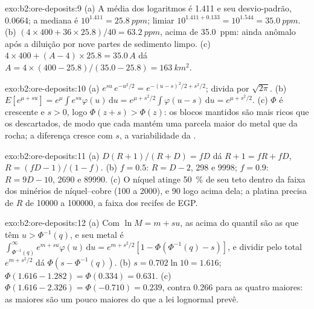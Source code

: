 \begin{solution}{exo:b2:ore-deposits:9}
(a) A média dos logaritmos é 1.411 e seu desvio-padrão, 0.0664; a mediana é $10^{1.411} = \qty{25.8}{ppm}$;
limiar $10^{1.411 + 0.133} = 10^{1.544} = \qty{35.0}{ppm}$. (b) $(4 \times 400 + 36 \times 25.8)/40 =
\qty{63.2}{ppm}$, acima de \qty{35.0}{ppm}: ainda anômalo após a diluição por nove partes de sedimento
limpo. (c) $4 \times 400 + (A - 4) \times 25.8 = 35.0\,A$ dá $A = 4 \times (400 -
25.8)/(35.0 - 25.8) = \qty{163}{km^2}$.
\end{solution}

\begin{solution}{exo:b2:ore-deposits:10}
(a) $e^{su}\,e^{-u^2/2} = e^{-(u - s)^2/2 + s^2/2}$; divida por $\sqrt{2\pi}$. (b) $E[e^{\mu + su}] =
e^{\mu}\int e^{su}\varphi(u)\,\mathrm{d}u = e^{\mu + s^2/2}\int\varphi(u - s)\,\mathrm{d}u = e^{\mu +
s^2/2}$. (c) $\Phi$ é crescente e $s > 0$, logo $\Phi(z + s) > \Phi(z)$: os blocos mantidos são mais ricos que
os descartados, de modo que cada  mantém uma parcela maior do metal que da rocha; a
diferença cresce com $s$, a variabilidade da .
\end{solution}

\begin{solution}{exo:b2:ore-deposits:11}
(a) $D(R + 1)/(R + D) = fD$ dá $R + 1 = fR + fD$, $R = (fD - 1)/(1 - f)$. (b) $f = 0.5$: $R = D - 2$,
298 e \num{9998}; $f = 0.9$: $R = 9D - 10$, \num{2690} e \num{89990}. (c) O níquel atinge
\qty{50}{\percent} de seu teto dentro da faixa dos minérios de níquel--cobre (100 a \num{2000}), e 90 logo acima dela;
a platina precisa de $R$ de \num{10000} a \num{100000}, a faixa dos recifes de EGP.
\end{solution}

\begin{solution}{exo:b2:ore-deposits:12}
(a) Com $\ln M = m + s u$, as  acima do quantil são as que têm $u > \Phi^{-1}(q)$, e seu metal é
$\int_{\Phi^{-1}(q)}^{\infty} e^{m + su}\varphi(u)\,\mathrm{d}u = e^{m + s^2/2}[1 - \Phi(\Phi^{-1}(q) -
s)]$, e dividir pelo total $e^{m + s^2/2}$ dá $\Phi(s - \Phi^{-1}(q))$. (b) $s = 0.702 \ln 10 =
1.616$; $\Phi(1.616 - 1.282) = \Phi(0.334) = 0.631$. (c) $\Phi(1.616 - 2.326) = \Phi(-0.710) = 0.239$,
contra 0.266 para as quatro maiores: as maiores  são um pouco maiores do que a lei lognormal
prevê.
\end{solution}

